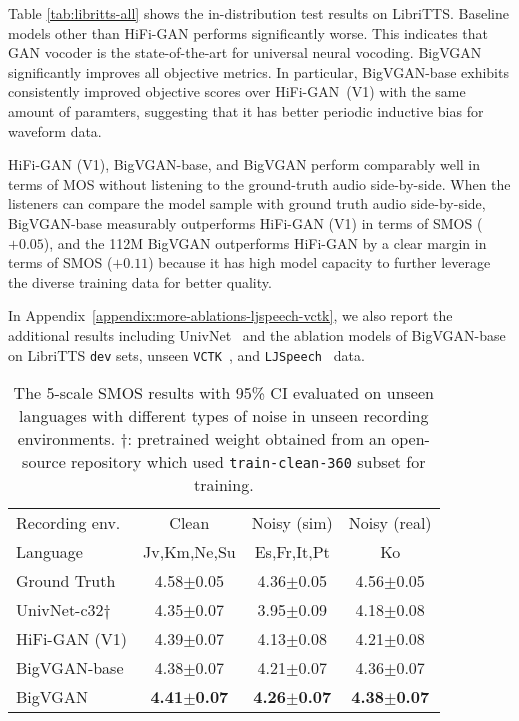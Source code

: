 \documentclass{article} \usepackage{iclr2023_conference,times}
\theoremstyle{plain}
\theoremstyle{definition}
\theoremstyle{remark}
\begin{document}
Table \ref{tab:libritts-all} shows the in-distribution test results on LibriTTS. Baseline models other than HiFi-GAN performs significantly worse. This indicates that GAN vocoder is the state-of-the-art for universal neural vocoding. BigVGAN significantly improves all objective metrics. In particular, BigVGAN-base exhibits consistently improved objective scores over HiFi-GAN~(V1) with the same amount of paramters, suggesting that it has better periodic inductive bias for waveform data.

HiFi-GAN (V1), BigVGAN-base, and BigVGAN perform comparably well in terms of MOS without listening to the ground-truth audio side-by-side. 
When the listeners can compare the model sample with ground truth audio side-by-side, BigVGAN-base measurably outperforms HiFi-GAN (V1) in terms of SMOS ($+0.05$), and the 112M BigVGAN outperforms HiFi-GAN by a clear margin in terms of SMOS ($+0.11$) because it has high model capacity to further leverage the diverse training data for better quality.


In Appendix~\ref{appendix:more-ablations-ljspeech-vctk}, we also report the additional results including UnivNet~\citep{jang2021univnet} and the ablation models of BigVGAN-base on LibriTTS \texttt{dev} sets, unseen \texttt{VCTK}~\citep{yamagishi2019cstr}, and \texttt{LJSpeech}~\citep{Ito2017ljspeech} data.


\begin{table}[t]
\vspace{-.2cm}
\caption{\footnotesize 
The 5-scale SMOS results with 95\% CI evaluated on unseen languages with different types of noise in unseen recording environments. $\dagger$: pretrained weight obtained from an open-source repository which used \texttt{train-clean-360} subset for training.}
\label{tab:multi-language}
\vspace{-0.1cm}
\begin{center}
\begin{small}
\begin{tabular}{l|ccc}
\toprule
Recording env.  & Clean & Noisy (sim) & Noisy (real)  \\
Language & Jv,Km,Ne,Su & Es,Fr,It,Pt & Ko \\
\midrule
Ground Truth & 4.58$\pm$0.05 & 4.36$\pm$0.05 & 4.56$\pm$0.05 \\
\midrule
UnivNet-c32$\dagger$ & 4.35$\pm$0.07 & 3.95$\pm$0.09 & 4.18$\pm$0.08 \\
HiFi-GAN (V1) & 4.39$\pm$0.07 & 4.13$\pm$0.08 & 4.21$\pm$0.08 \\
BigVGAN-base & 4.38$\pm$0.07 & 4.21$\pm$0.07 & 4.36$\pm$0.07 \\
BigVGAN & \textbf{4.41$\pm$0.07} & \textbf{4.26$\pm$0.07} & \textbf{4.38$\pm$0.07} \\
\bottomrule
\end{tabular}
\end{small}
\end{center}
\vskip -0.1in
\end{table}
\end{document}
